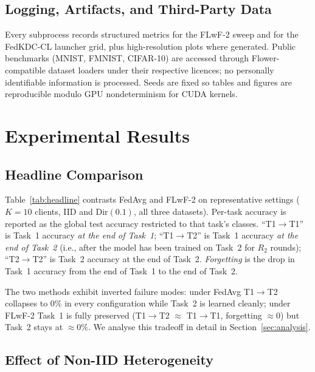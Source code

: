 \documentclass[journal]{IEEEtran}
\begin{document}
\subsection{Logging, Artifacts, and Third-Party Data}

Every subprocess records structured metrics for the FLwF-2 sweep and for
the FedKDC-CL launcher grid, plus high-resolution plots where generated.
Public benchmarks (MNIST, FMNIST, CIFAR-10) are accessed through
Flower-compatible dataset loaders under their respective licences; no
personally identifiable information is processed. Seeds are fixed so
tables and figures are reproducible modulo GPU nondeterminism for CUDA
kernels.

\section{Experimental Results}
\label{sec:results}

\subsection{Headline Comparison}

Table~\ref{tab:headline} contrasts FedAvg and FLwF-2 on representative
settings ($K{=}10$ clients, IID and $\mathrm{Dir}(0.1)$, all three
datasets). Per-task accuracy is reported as the global test accuracy
restricted to that task's classes. ``T1$\to$T1'' is Task~1 accuracy
\emph{at the end of Task~1}; ``T1$\to$T2'' is Task~1 accuracy
\emph{at the end of Task~2} (i.e., after the model has been trained on
Task~2 for $R_2$ rounds); ``T2$\to$T2'' is Task~2 accuracy at the end
of Task~2. \emph{Forgetting} is the drop in Task~1 accuracy from the
end of Task~1 to the end of Task~2.



The two methods exhibit inverted failure modes: under FedAvg
T1$\to$T2 collapses to $0\%$ in every configuration while Task~2 is
learned cleanly; under FLwF-2 Task~1 is fully preserved
(T1$\to$T2 $\approx$ T1$\to$T1, forgetting $\approx 0$) but Task~2
stays at $\approx 0\%$. We analyse this tradeoff in detail in
Section~\ref{sec:analysis}.

\subsection{Effect of Non-IID Heterogeneity}
\end{document}
